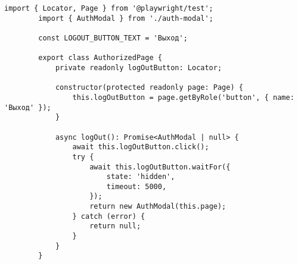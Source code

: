 	\begin{lstlisting}[caption={pages/authorized-page.ts}]
		import { Locator, Page } from '@playwright/test';
		import { AuthModal } from './auth-modal';
		
		const LOGOUT_BUTTON_TEXT = 'Выход';
		
		export class AuthorizedPage {
			private readonly logOutButton: Locator;
			
			constructor(protected readonly page: Page) {
				this.logOutButton = page.getByRole('button', { name: 'Выход' });
			}
			
			async logOut(): Promise<AuthModal | null> {
				await this.logOutButton.click();
				try {
					await this.logOutButton.waitFor({
						state: 'hidden',
						timeout: 5000,
					});
					return new AuthModal(this.page);
				} catch (error) {
					return null;
				}
			}
		}
	\end{lstlisting}
	
